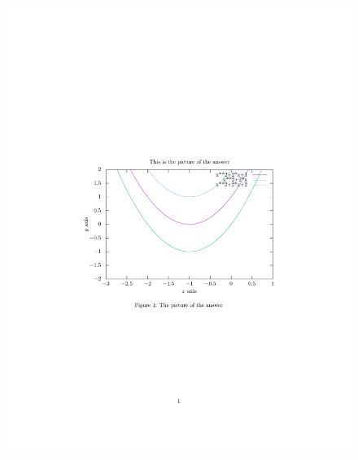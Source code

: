 \documentclass[10pt]{ctexart}
\begin{document}
\begin{figure}[H]
  \centering
\includegraphics[scale=0.75]{re.pdf}
\end{figure}
\end{document}
